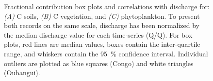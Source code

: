 \begin{figure}[p]
	\caption[Discharge vs. end-member fractional contribution]{Fractional contribution box plots and correlations with discharge for: \textit{(A)} C soils, \textit{(B)} C vegetation, and \textit{(C)} phytoplankton. To present both records on the same scale, discharge has been normalized by the median discharge value for each time-series (Q/Q). For box plots, red lines are median values, boxes contain the inter-quartile range, and whiskers contain the \SI{95}{\%} confidence interval. Individual outliers are plotted as blue squares (Congo) and white triangles (Oubangui).}
	\label{Ch5Fig:7} 
\end{figure}


